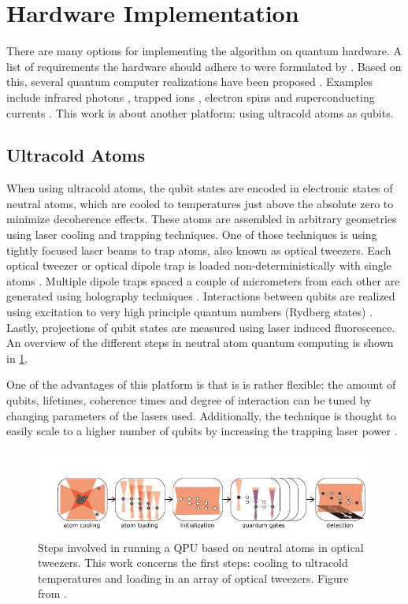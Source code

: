 \section{Hardware Implementation}

There are many options for implementing the algorithm on quantum hardware.
A list of requirements the hardware should adhere to were formulated by \cite{DiVincenzo2000} .
Based on this, several quantum computer realizations have been proposed \cite{Ladd2010}.
Examples include infrared photons \cite{Matthews2009}, trapped ions \cite{Benhelm2008,Schindler2013}, electron spins \cite{Press2008} and superconducting currents \cite{DiCarlo2009,Arute2019}. 
This work is about another platform: using ultracold atoms as qubits. 

\subsection{Ultracold Atoms}

When using ultracold atoms, the qubit states are encoded in electronic states of neutral atoms, which are cooled to temperatures just above the absolute zero to minimize decoherence effects. 
These atoms are assembled in arbitrary geometries using laser cooling and trapping techniques.
One of those techniques is using tightly focused laser beams to trap atoms, also known as optical tweezers.
Each optical tweezer or optical dipole trap \cite{Chu1986} is loaded non-deterministically with single atoms \cite{Schlosser2001}. 
Multiple dipole traps spaced a couple of micrometers from each other are generated using holography techniques \cite{Bergamini2004}.
Interactions between qubits are realized using excitation to very high principle quantum numbers (Rydberg states) \cite{Levine2018,Madjarov2020}. 
Lastly, projections of qubit states are measured using laser induced fluorescence.
An overview of the different steps in neutral atom quantum computing is shown in \cref{fig:ComputingSteps}.

One of the advantages of this platform is that is is rather flexible: the amount of qubits, lifetimes, coherence times and degree of interaction can be tuned by changing parameters of the lasers used. 
Additionally, the technique is thought to easily scale to a higher number of qubits by increasing the trapping laser power \cite{Henriet2020}.

\begin{figure}
	\centering
	\includegraphics[width=\linewidth]{figures/ComputingSteps.pdf}
	\caption{Steps involved in running a \ac{QPU} based on neutral atoms in optical tweezers. 
	This work concerns the first steps: cooling to ultracold temperatures and loading in an array of optical tweezers.
	Figure from \cite{Wu2021}.}
	\label{fig:ComputingSteps}
\end{figure}

